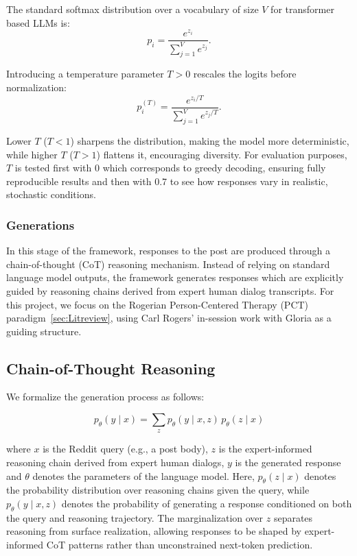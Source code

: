 The standard softmax distribution over a vocabulary of size $V$ for transformer based LLMs is: 
\begin{equation}
p_i = \frac{e^{z_i}}{\sum_{j=1}^{V} e^{z_j}}.
\label{eq:softmax}
\end{equation}

Introducing a temperature parameter $T > 0$ rescales the logits before normalization:  
\begin{equation}
p_i^{(T)} = \frac{e^{z_i / T}}{\sum_{j=1}^{V} e^{z_j / T}}.
\label{eq:temp-softmax}
\end{equation}

Lower $T$ ($T<1$) sharpens the distribution, making the model more deterministic, while higher $T$ ($T>1$) flattens it, encouraging diversity. For evaluation purposes, $T$ is tested first with 0 which corresponds to greedy decoding, ensuring fully reproducible results and then with 0.7 to see how responses vary in realistic, stochastic conditions.

\subsubsection{Generations}
In this stage of the framework, responses to the post are produced through a chain-of-thought (CoT) reasoning mechanism. Instead of relying on standard language model outputs, the framework generates responses which are explicitly guided by reasoning chains derived from expert human dialog transcripts.
For this project, we focus on the Rogerian Person-Centered Therapy (PCT) paradigm~\ref{sec:Litreview}, using Carl Rogers’ in-session work with Gloria \cite{rogersgloria} as a guiding structure. 

\subsection*{Chain-of-Thought Reasoning}

We formalize the generation process as follows:

\[
p_\theta(y \mid x) = \sum_{z} p_\theta(y \mid x, z) \, p_\theta(z \mid x)
\]

where $x$ is the Reddit query (e.g., a post body), $z$ is the expert-informed reasoning chain derived from expert human dialogs, $y$ is the generated response and $\theta$ denotes the parameters of the language model. Here, $p_\theta(z \mid x)$ denotes the probability distribution over reasoning chains given the query, while $p_\theta(y \mid x, z)$ denotes the probability of generating a response conditioned on both the query and reasoning trajectory. The marginalization over $z$ separates reasoning from surface realization, allowing responses to be shaped by expert-informed CoT patterns rather than unconstrained next-token prediction.


